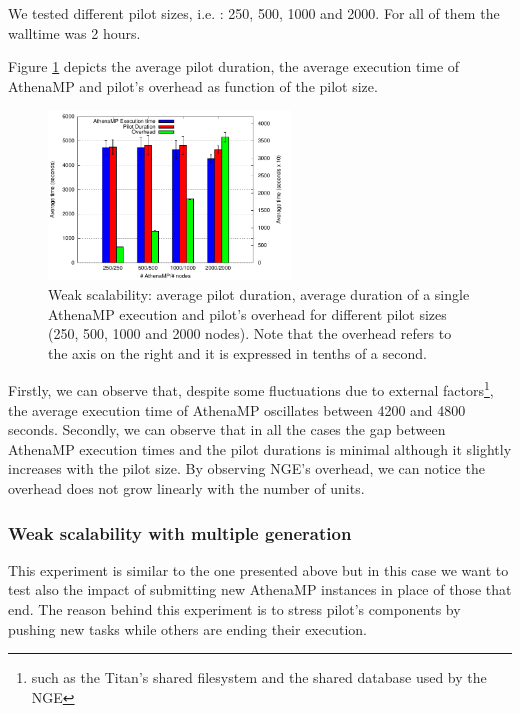 We tested different pilot sizes, i.e. : 250, 500, 1000 and 2000. For all of them the walltime was 2 hours.

Figure \ref{fig:weakScal1a} depicts the average pilot duration, the average execution time of AthenaMP and pilot's overhead as function of the pilot size.  

\begin{figure}[!htb]
        \includegraphics[height=4.5cm,width=\columnwidth]{./figures/NGE/weak1.pdf}
    \caption{Weak scalability: average pilot duration, average duration of a single AthenaMP execution and pilot's overhead for different pilot sizes (250, 500, 1000 and 2000 nodes). Note that the overhead refers to the axis on the right and it is expressed in tenths of a second.}
\label{fig:weakScal1a}
\end{figure}

Firstly, we can observe that, despite some fluctuations due to external factors\footnote{such as the Titan's shared filesystem and the shared database used by the NGE}, the average execution time of AthenaMP oscillates between 4200 and 4800 seconds. Secondly, we can observe that in all the cases the gap between AthenaMP execution times and the pilot durations is minimal although it slightly increases with the pilot size.
By observing NGE's overhead, we can notice the overhead does not grow linearly with the number of units.



\subsubsection{Weak scalability with multiple generation }
This experiment is similar to the one presented above but in this case we want to test also the impact of submitting new AthenaMP instances in place of those that end. The reason behind this experiment is to stress pilot's components by pushing new tasks while others are ending their execution.

